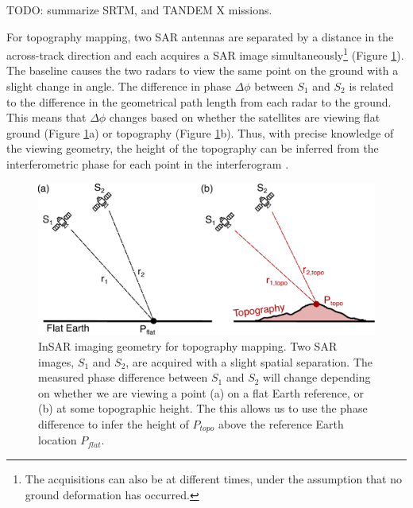 TODO: summarize SRTM, and TANDEM X missions.
%


For topography mapping, two SAR antennas are separated by a distance in the across-track direction and each acquires a SAR image simultaneously\footnote{The acquisitions can also be at different times, under the assumption that no ground deformation has occurred.} (Figure \ref{fig:ch2-insar-geometry-topo}). The baseline causes the two radars to view the same point on the ground with a slight change in angle.
The difference in phase $\Delta \phi$ between $S_1$ and $S_2$ is related to the difference in the geometrical path length from each radar to the ground.
This means that $\Delta \phi$ changes based on whether the satellites are viewing flat ground (Figure \ref{fig:ch2-insar-geometry-topo}a) or topography (Figure \ref{fig:ch2-insar-geometry-topo}b). Thus, with precise knowledge of the viewing geometry, the height of the topography can be inferred from the interferometric phase for each point in the interferogram \citep{Simons2007InterferometricSyntheticAperture}. 


\begin{figure}
	\centering
	\includegraphics[width=0.99\linewidth]{figures/chapter2-sar/insar-geometry-topo.pdf}
	\caption[InSAR imaging geometry for topography mapping]{InSAR imaging geometry for topography mapping. Two SAR images, $S_1$ and $S_2$, are acquired with a slight spatial separation. The measured phase difference between $S_1$ and $S_2$ will change depending on whether we are viewing a point (a) on a flat Earth reference, or (b) at some topographic height.
		 The this allows us to use the phase difference to infer the height of $P_{topo}$ above the reference Earth location $P_{flat}$.
	}
	\label{fig:ch2-insar-geometry-topo}
\end{figure}


